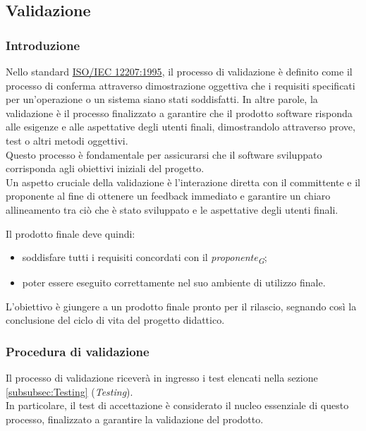 \subsection{Validazione}
\label{subsec:validazione}

\subsubsection{Introduzione}
Nello standard \href{https://www.math.unipd.it/~tullio/IS-1/2009/Approfondimenti/ISO_12207-1995.pdf}{ISO/IEC 12207:1995}, il processo di validazione è definito come il processo di conferma attraverso dimostrazione oggettiva che i requisiti specificati per un'operazione o un sistema siano stati soddisfatti. In altre parole, la validazione è il processo finalizzato a garantire che il prodotto software risponda alle esigenze e alle aspettative degli utenti finali, dimostrandolo attraverso prove, test o altri metodi oggettivi. \\
Questo processo è fondamentale per assicurarsi che il software sviluppato corrisponda agli obiettivi iniziali del progetto. \\
Un aspetto cruciale della validazione è l'interazione diretta con il committente e il proponente al fine di ottenere un feedback immediato e garantire un chiaro allineamento tra ciò che è stato sviluppato e le aspettative degli utenti finali.

Il prodotto finale deve quindi: 
\begin{itemize}
    \item 
        soddisfare tutti i requisiti concordati con il \textit{proponente}\textsubscript{\textit{G}}; 
    \item 
        poter essere eseguito correttamente nel suo ambiente di utilizzo finale.
\end{itemize}

L'obiettivo è giungere a un prodotto finale pronto per il rilascio, segnando così la conclusione del ciclo di vita del progetto didattico. 

\subsubsection{Procedura di validazione}
Il processo di validazione riceverà in ingresso i test elencati nella sezione \ref{subsubsec:Testing} (\textit{Testing}). \\
In particolare, il test di accettazione è considerato il nucleo essenziale di questo processo, finalizzato a garantire la validazione del prodotto.

